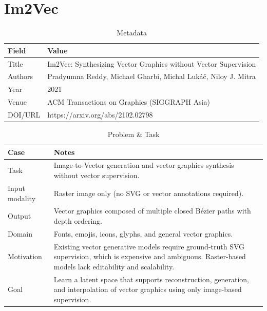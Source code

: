 \chapter{Im2Vec}
\begin{table}[h!]
\centering
\caption{Metadata}
\begin{tabular}{|l|l|}
\hline
\textbf{Field} & \textbf{Value} \\ \hline
Title & Im2Vec: Synthesizing Vector Graphics without Vector Supervision \\ \hline
Authors & Pradyumna Reddy, Michael Gharbi, Michal Lukáč, Niloy J. Mitra \\ \hline
Year & 2021 \\ \hline
Venue & ACM Transactions on Graphics (SIGGRAPH Asia) \\ \hline
DOI/URL & https://arxiv.org/abs/2102.02798 \\ \hline
\end{tabular}
\end{table}


\begin{table}[h!]
\centering
\caption{Problem \& Task}
\begin{tabular}{|l|p{10cm}|}
\hline
\textbf{Case} & \textbf{Notes} \\ \hline
Task &
Image-to-Vector generation and vector graphics synthesis without vector supervision. \\ \hline

Input modality &
Raster image only (no SVG or vector annotations required). \\ \hline

Output &
Vector graphics composed of multiple closed Bézier paths with depth ordering. \\ \hline

Domain &
Fonts, emojis, icons, glyphs, and general vector graphics. \\ \hline

Motivation &
Existing vector generative models require ground-truth SVG supervision, which is expensive and ambiguous. Raster-based models lack editability and scalability. \\ \hline

Goal &
Learn a latent space that supports reconstruction, generation, and interpolation of vector graphics using only image-based supervision. \\ \hline
\end{tabular}
\end{table}



